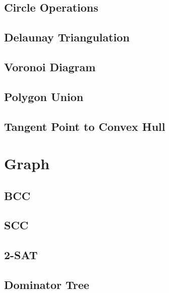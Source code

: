 \documentclass{article}
\begin{document}
\subsection{Circle Operations}


\subsection{Delaunay Triangulation}


\subsection{Voronoi Diagram}


\subsection{Polygon Union}


\subsection{Tangent Point to Convex Hull}


\section{Graph}

\subsection{BCC}


\subsection{SCC}


\subsection{2-SAT}


\subsection{Dominator Tree}

\end{document}
